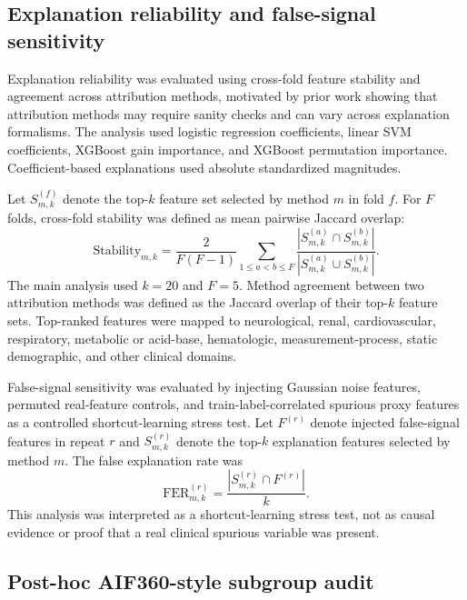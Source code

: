 \documentclass[10pt,twocolumn,letterpaper]{article}
\begin{document}
\subsection{Explanation reliability and false-signal sensitivity}

Explanation reliability was evaluated using cross-fold feature stability and agreement across attribution methods, motivated by prior work showing that attribution methods may require sanity checks and can vary across explanation formalisms\cite{adebayo2018sanity,lundberg2017attribution}. The analysis used logistic regression coefficients, linear SVM coefficients, XGBoost gain importance, and XGBoost permutation importance. Coefficient-based explanations used absolute standardized magnitudes.

Let $S_{m,k}^{(f)}$ denote the top-$k$ feature set selected by method $m$ in fold $f$. For $F$ folds, cross-fold stability was defined as mean pairwise Jaccard overlap:
\begin{equation}
\mathrm{Stability}_{m,k}
=
\frac{2}{F(F-1)}
\sum_{1 \leq a < b \leq F}
\frac{
|S_{m,k}^{(a)} \cap S_{m,k}^{(b)}|
}{
|S_{m,k}^{(a)} \cup S_{m,k}^{(b)}|
}.
\end{equation}
The main analysis used $k=20$ and $F=5$. Method agreement between two attribution methods was defined as the Jaccard overlap of their top-$k$ feature sets. Top-ranked features were mapped to neurological, renal, cardiovascular, respiratory, metabolic or acid-base, hematologic, measurement-process, static demographic, and other clinical domains.

False-signal sensitivity was evaluated by injecting Gaussian noise features, permuted real-feature controls, and train-label-correlated spurious proxy features as a controlled shortcut-learning stress test\cite{geirhos2020shortcut}. Let $F^{(r)}$ denote injected false-signal features in repeat $r$ and $S_{m,k}^{(r)}$ denote the top-$k$ explanation features selected by method $m$. The false explanation rate was
\begin{equation}
\mathrm{FER}_{m,k}^{(r)}
=
\frac{
|S_{m,k}^{(r)} \cap F^{(r)}|
}{k}.
\end{equation}
This analysis was interpreted as a shortcut-learning stress test, not as causal evidence or proof that a real clinical spurious variable was present.

\subsection{Post-hoc AIF360-style subgroup audit}
\end{document}

